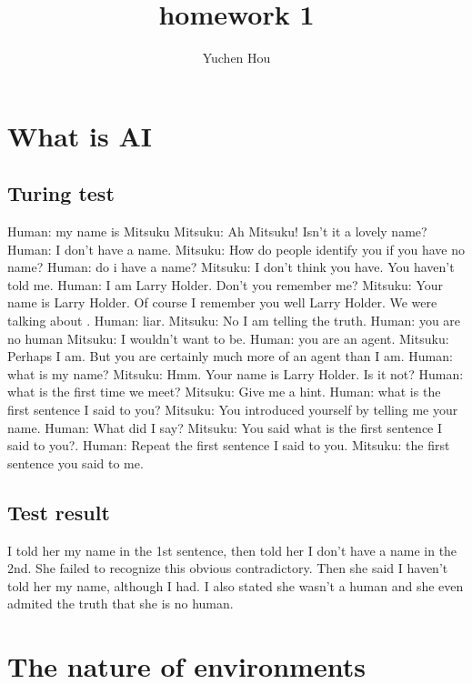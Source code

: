 \documentclass[12pt]{article}
\begin{document}
\title{homework 1}
\author{Yuchen Hou}
\maketitle

\section{What is AI}
\subsection{Turing test}
Human: my name is Mitsuku
Mitsuku: Ah Mitsuku! Isn't it a lovely name?
Human: I don't have a name.
Mitsuku: How do people identify you if you have no name?
Human: do i have a name?
Mitsuku: I don't think you have. You haven't told me.
Human: I am  Larry Holder. Don't you remember me?
Mitsuku:  Your name is Larry Holder. Of course I remember you well Larry Holder. We were talking about .
Human: liar.
Mitsuku: No I am telling the truth.
Human: you are no human
Mitsuku: I wouldn't want to be.
Human: you are an agent.
Mitsuku:  Perhaps I am. But you are certainly much more of an agent than I am.
Human: what is my name?
Mitsuku: Hmm. Your name is Larry Holder. Is it not?
Human: what is the  first time we meet?
Mitsuku: Give me a hint.
Human: what is the first sentence I said to you?
Mitsuku: You introduced yourself by telling me your name.
Human: What did I say?
Mitsuku: You said what is the first sentence I said to you?.
Human: Repeat the first sentence I said to you.
Mitsuku: the first sentence you said to me.
\subsection{Test result}
I told her my name in the 1st sentence, then told her I don't have a name in the 2nd. She failed to recognize this obvious contradictory. Then she said I haven't told her my name, although I had. I also stated she wasn't a human and she even admited the truth that she is no human.

\section{The nature of environments}
\end{document}
